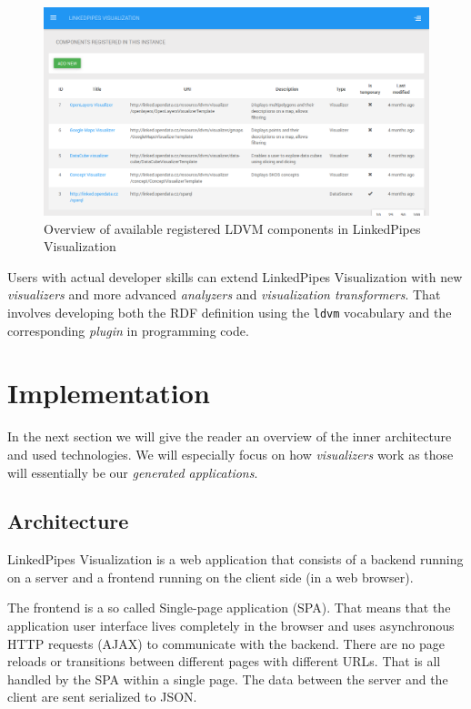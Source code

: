 \begin{figure}
	\centering
	\includegraphics[width=130mm]{img/03_linked_pipes_components.png}
	\caption{Overview of available registered LDVM components in LinkedPipes Visualization} 
	\label{fig:linked-pipes-components}
\end{figure}

Users with actual developer skills can extend LinkedPipes Visualization with new \emph{visualizers} and more advanced \emph{analyzers} and \emph{visualization transformers}. That involves developing both the RDF definition using the \texttt{ldvm} vocabulary and the corresponding \emph{plugin} in programming code. 

\section{Implementation}

In the next section we will give the reader an overview of the inner architecture and used technologies. We will especially focus on how \emph{visualizers} work as those will essentially be our \emph{generated applications}.

\subsection{Architecture}
\label{sec:linkedpipes:architecture}

LinkedPipes Visualization is a web application that consists of a backend running on a server and a frontend running on the client side (in a web browser). 

The frontend is a so called Single-page application (SPA). That means that the application user interface lives completely in the browser and uses asynchronous HTTP requests (AJAX) to communicate with the backend. There are no page reloads or transitions between different pages with different URLs. That is all handled by the SPA within a single page. The data between the server and the client are sent serialized to JSON.

